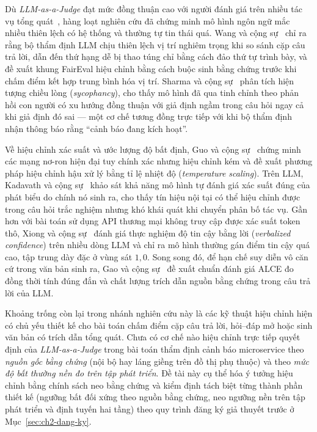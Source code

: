 Dù \emph{LLM-as-a-Judge} đạt mức đồng thuận cao với người đánh giá trên nhiều tác vụ tổng quát~\cite{zheng2023judging}, hàng loạt nghiên cứu đã chứng minh mô hình ngôn ngữ mắc nhiều thiên lệch có hệ thống và thường tự tin thái quá. Wang và cộng sự~\cite{wang2024fair} chỉ ra rằng bộ thẩm định LLM chịu thiên lệch vị trí nghiêm trọng khi so sánh cặp câu trả lời, dẫn đến thứ hạng dễ bị thao túng chỉ bằng cách đảo thứ tự trình bày, và đề xuất khung FairEval hiệu chỉnh bằng cách buộc sinh bằng chứng trước khi chấm điểm kết hợp trung bình hóa vị trí. Sharma và cộng sự~\cite{sharma2024sycophancy} phân tích hiện tượng chiều lòng (\emph{sycophancy}), cho thấy mô hình đã qua tinh chỉnh theo phản hồi con người có xu hướng đồng thuận với giả định ngầm trong câu hỏi ngay cả khi giả định đó sai — một cơ chế tương đồng trực tiếp với  khi bộ thẩm định nhận thông báo rằng ``cảnh báo đang kích hoạt''.

Về hiệu chỉnh xác suất và ước lượng độ bất định, Guo và cộng sự~\cite{guo2017calibration} chứng minh các mạng nơ-ron hiện đại tuy chính xác nhưng hiệu chỉnh kém và đề xuất phương pháp hiệu chỉnh hậu xử lý bằng tỉ lệ nhiệt độ (\emph{temperature scaling}). Trên LLM, Kadavath và cộng sự~\cite{kadavath2022mostly} khảo sát khả năng mô hình tự đánh giá xác suất đúng của phát biểu do chính nó sinh ra, cho thấy tín hiệu nội tại có thể hiệu chỉnh được trong câu hỏi trắc nghiệm nhưng khó khái quát khi chuyển phân bố tác vụ. Gần hơn với bài toán sử dụng API thương mại không truy cập được xác suất token thô, Xiong và cộng sự~\cite{xiong2024uncertainty} đánh giá thực nghiệm độ tin cậy bằng lời (\emph{verbalized confidence}) trên nhiều dòng LLM và chỉ ra mô hình thường gán điểm tin cậy quá cao, tập trung dày đặc ở vùng sát $1{,}0$. Song song đó, để hạn chế suy diễn vô căn cứ trong văn bản sinh ra, Gao và cộng sự~\cite{gao2023alce} đề xuất chuẩn đánh giá ALCE đo đồng thời tính đúng đắn và chất lượng trích dẫn nguồn bằng chứng trong câu trả lời của LLM.

Khoảng trống còn lại trong nhánh nghiên cứu này là các kỹ thuật hiệu chỉnh hiện có chủ yếu thiết kế cho bài toán chấm điểm cặp câu trả lời, hỏi--đáp mở hoặc sinh văn bản có trích dẫn tổng quát. Chưa có cơ chế nào hiệu chỉnh trực tiếp quyết định của \emph{LLM-as-a-Judge} trong bài toán thẩm định cảnh báo microservice theo \emph{nguồn gốc bằng chứng} (nội bộ hay láng giềng trên đồ thị phụ thuộc) và theo \emph{mức độ bất thường nền đo trên tập phát triển}. Đề tài này cụ thể hóa ý tưởng hiệu chỉnh bằng chính sách neo bằng chứng và kiểm định tách biệt từng thành phần thiết kế (ngưỡng bất đối xứng theo nguồn bằng chứng, neo ngưỡng nền trên tập phát triển và định tuyến hai tầng) theo quy trình đăng ký giả thuyết trước ở Mục~\ref{sec:ch2-dang-ky}.

